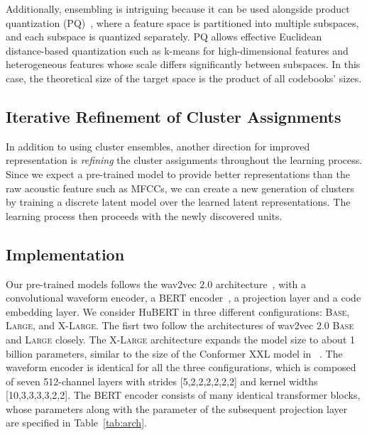 Additionally, ensembling is intriguing because it can be used alongside product quantization (PQ)~\cite{gray1998quantization}, where a feature space is partitioned into multiple subspaces, and each subspace is quantized separately. PQ allows effective Euclidean distance-based quantization such as k-means for high-dimensional features and heterogeneous features whose scale differs significantly between subspaces. In this case, the theoretical size of the target space is the product of all codebooks' sizes.

\subsection{Iterative Refinement of Cluster Assignments}
In addition to using cluster ensembles, another direction for improved representation is \textit{refining} the cluster assignments throughout the learning process. Since we expect a pre-trained model to provide better representations than the raw acoustic feature such as MFCCs, we can create a new generation of clusters by training a discrete latent model over the learned latent representations. The learning process then proceeds with the newly discovered units.

\subsection{Implementation}\label{sec:impl}
Our pre-trained models follows the wav2vec 2.0 architecture~\cite{baevski2020wav2vec}, with a convolutional waveform encoder, a BERT encoder~\cite{devlin2018bert}, a projection layer and a code embedding layer. We consider HuBERT in three different configurations: \textsc{Base}, \textsc{Large}, and \textsc{X-Large}. The fisrt two follow the architectures of wav2vec 2.0 \textsc{Base} and \textsc{Large} closely. The \textsc{X-Large} architecture expands the model size to about 1 billion parameters, similar to the size of the Conformer XXL model in ~\cite{zhang2020pushing}. 
The waveform encoder is identical for all the three configurations, which is composed of seven 512-channel layers with strides [5,2,2,2,2,2,2] and kernel widths [10,3,3,3,3,2,2]. The BERT encoder consists of many identical transformer blocks, whose parameters along with the parameter of the subsequent projection layer are specified in Table~\ref{tab:arch}.

